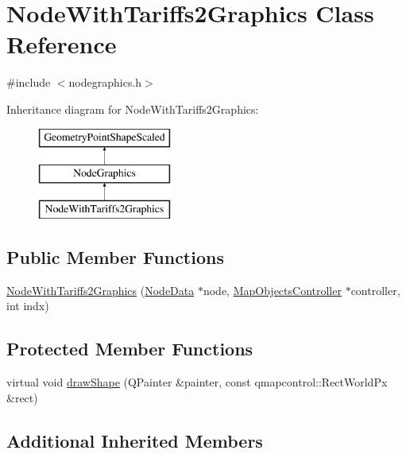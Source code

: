 \hypertarget{class_node_with_tariffs2_graphics}{}\section{Node\+With\+Tariffs2\+Graphics Class Reference}
\label{class_node_with_tariffs2_graphics}


{\ttfamily \#include $<$nodegraphics.\+h$>$}

Inheritance diagram for Node\+With\+Tariffs2\+Graphics\+:\begin{figure}[H]
\begin{center}
\leavevmode
\includegraphics[height=3.000000cm]{da/d8f/class_node_with_tariffs2_graphics}
\end{center}
\end{figure}
\subsection*{Public Member Functions}
\begin{DoxyCompactItemize}
\item 
\mbox{\hyperlink{class_node_with_tariffs2_graphics_a953c7c63cbb369d4b33587663c20c7f3}{Node\+With\+Tariffs2\+Graphics}} (\mbox{\hyperlink{class_node_data}{Node\+Data}} $\ast$node, \mbox{\hyperlink{class_map_objects_controller}{Map\+Objects\+Controller}} $\ast$controller, int indx)
\end{DoxyCompactItemize}
\subsection*{Protected Member Functions}
\begin{DoxyCompactItemize}
\item 
virtual void \mbox{\hyperlink{class_node_with_tariffs2_graphics_ab3aad6d1c5b6c5ecb551a199540d8f87}{draw\+Shape}} (Q\+Painter \&painter, const qmapcontrol\+::\+Rect\+World\+Px \&rect)
\end{DoxyCompactItemize}
\subsection*{Additional Inherited Members}


